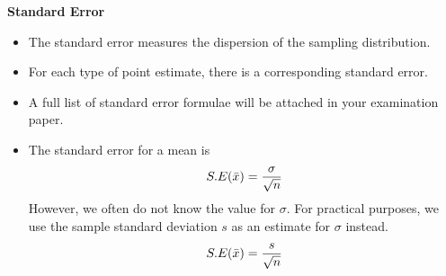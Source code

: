 



\textbf{Standard Error}

\begin{itemize}
	\item The standard error measures the dispersion of the sampling distribution.
	\item For each type of point estimate, there is a corresponding standard error.
	\item A full list of standard error formulae will be attached in your examination paper.
	\item The standard error for a  mean is
	\[ S.E( \bar{x} )  = {\sigma \over \sqrt{n}} \]
	However, we often do not know the value for $\sigma$. For practical purposes, we use the sample standard deviation $s$ as an estimate for $\sigma$ instead.
	\[ S.E( \bar{x} )  = {s \over \sqrt{n}} \]
\end{itemize}


